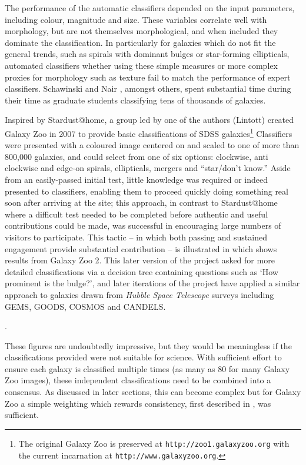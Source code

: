 \documentclass{ar2e}
\begin{document}

The performance of the automatic classifiers depended on the input parameters,
including colour, magnitude and size. These variables correlate well with
morphology, but are not themselves morphological, and when included they
dominate the classification. In particularly for galaxies which do not fit the
general trends, such as spirals with dominant bulges or star-forming
ellipticals, automated classifiers whether using these simple measures or more
complex proxies for morphology such as texture fail to match the performance
of expert classifiers. Schawinski \citep{Scha2007} and Nair \citep{Nair}, amongst others, spent substantial
time during their time as graduate students classifying tens of thousands of
galaxies. 

Inspired by Stardust@home, a group led by one of the authors (Lintott) created
Galaxy Zoo in 2007 to provide basic classifications of SDSS
galaxies\footnote{The original Galaxy Zoo is preserved at
\texttt{http://zoo1.galaxyzoo.org} with the current incarnation at
\texttt{http://www.galaxyzoo.org}.} Classifiers were presented with a coloured
image centered on and scaled to one of more than 800,000 galaxies, and could
select from one of six options: clockwise, anti clockwise and edge-on spirals,
ellipticals, mergers and ``star/don't know.'' Aside from  an easily-passed
initial test, little knowledge was required or indeed presented to classifiers,
enabling them to proceed quickly doing something real soon after arriving at the
site; this approach, in contrast to Stardust@home where a difficult test needed
to be completed before authentic and useful contributions could be made, was
successful in encouraging large numbers of visitors to participate. This tactic
-- in which both passing and sustained engagement provide substantial
contribution -- is illustrated in \Fref{}  which shows results from Galaxy Zoo
2. 
This later version of the project asked for more detailed
classifications via a decision tree containing questions such as `How prominent
is the bulge?', and later iterations of the project have applied a similar
approach to galaxies drawn from \emph{Hubble Space Telescope} surveys including
\textsc{GEMS, GOODS, COSMOS} and \textsc{CANDELS}. 

. 

These figures are undoubtedly impressive, but they would be meaningless if the
classifications provided were not suitable for science. With sufficient effort
to ensure each galaxy is classified multiple times (as many as 80 for many
Galaxy Zoo images), these independent classifications need to be combined into a
consensus. As discussed in later sections, this can become complex but for
Galaxy Zoo a simple weighting which rewards consistency, first described in
\citet{Land++}, was sufficient. 
\end{document}
